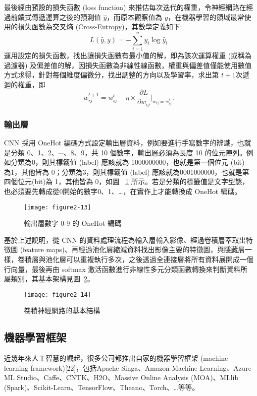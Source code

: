\documentclass[12pt, a4paper]{article} 				%
\begin{document}
最後經由預設的損失函數 (loss function) 來推估每次迭代的權重，令神經網路在經過前饋式傳遞運算之後的預測值 $\hat{y}$，而原本觀察值為 $y$，在機器學習的領域最常使用的損失函數為交叉熵 (Cross-Entropy)，其數學定義如下:
\[
L(\hat{y},y)=-\sum_{i=1}^ny_i\log\hat{y}_i
\]
運用設定的損失函數，找出讓損失函數有最小值的解，即為該次運算權重 (或稱為過濾器) 及偏差值的解，因損失函數為非線性線函數，權重與偏差值僅能使用數值方式求得，針對每個維度偏微分，找出調整的方向以及學習率，求出第 $t+1$次遞迴的權重，即
\[
w_{ij}^{t+1}=w_{ij}^{t}-\eta\times \frac{\partial L}{\partial w_{ij}}|_{w_{ij}=w_{ij}^{t}}.
\]

\subsubsection{輸出層}
CNN 採用 OneHot 編碼方式設定輸出層資料，例如要進行手寫數字的辨識，也就是分類 0、1、2、$\cdots$、8、9，共 10 個數字，輸出層必須為長度 10 的位元陣列。例如分類為0，則其標籤值 (label) 應該就為 1000000000，也就是第一個位元 (bit) 為1，其他皆為 0；分類為3，則其標籤值 (label) 應該就為0001000000，也就是第四個位元(bit)為 1，其他皆為 0，如圖 ~\ref{Figure2-13} 所示。若是分類的標籤值是文字型態，也必須要先轉成從0開始的數字0、1、…，在實作上才能轉換成 OneHot 編碼。

\begin{figure}[!ht]
\begin{center}
\texttt{[image: figure2-13]}
\caption{輸出層數字 0-9 的 OneHot 編碼}\label{Figure2-13}
\end{center}
\end{figure}

基於上述說明，從 CNN 的資料處理流程為輸入層輸入影像、經過卷積層萃取出特徵圖 (feature maps)、再經過池化層縮減資料找出影像主要的特徵圖，與隱藏層一樣，卷積層與池化層可以重複執行多次，之後透過全連接層將所有資料展開成一個行向量，最後再由 softmax 激活函數進行非線性多元分類函數轉換來判斷資料所屬類別，其基本架構見圖~\ref{Figure2-14}。

\begin{figure}[!ht]
\begin{center}
\texttt{[image: figure2-14]}
\caption{卷積神經網路的基本結構}\label{Figure2-14}
\end{center}
\end{figure}
\subsection{機器學習框架}
近幾年來人工智慧的崛起，很多公司都推出自家的機器學習框架 (machine learning framework)[22]，包括Apache Singa、Amazon Machine Learning、Azure ML Studio、Caffe、CNTK、H2O、Massive Online Analysis (MOA)、MLlib (Spark)、Scikit-Learn、TensorFlow、Theano、Torch、…等等。
\end{document}
